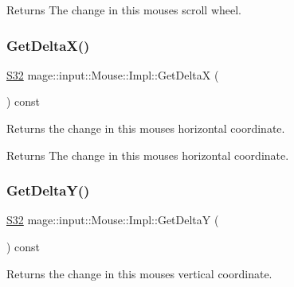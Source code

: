 \begin{DoxyReturn}{Returns}
The change in this mouse\textquotesingle{}s scroll wheel. 
\end{DoxyReturn}
\hypertarget{classmage_1_1input_1_1_mouse_1_1_impl_a61e7ce497a1779fcd58bce1bf067abfe}{}\label{classmage_1_1input_1_1_mouse_1_1_impl_a61e7ce497a1779fcd58bce1bf067abfe} 
\subsubsection{\texorpdfstring{Get\+Delta\+X()}{GetDeltaX()}}
{\footnotesize\ttfamily \hyperlink{namespacemage_a642e05c5c83642b6946703615cdbf2da}{S32} mage\+::input\+::\+Mouse\+::\+Impl\+::\+Get\+DeltaX (\begin{DoxyParamCaption}{ }\end{DoxyParamCaption}) const\hspace{0.3cm}{\ttfamily [noexcept]}}

Returns the change in this mouse\textquotesingle{}s horizontal coordinate.

\begin{DoxyReturn}{Returns}
The change in this mouse\textquotesingle{}s horizontal coordinate. 
\end{DoxyReturn}
\hypertarget{classmage_1_1input_1_1_mouse_1_1_impl_accce0b038c380bf32625de965a83e1db}{}\label{classmage_1_1input_1_1_mouse_1_1_impl_accce0b038c380bf32625de965a83e1db} 
\subsubsection{\texorpdfstring{Get\+Delta\+Y()}{GetDeltaY()}}
{\footnotesize\ttfamily \hyperlink{namespacemage_a642e05c5c83642b6946703615cdbf2da}{S32} mage\+::input\+::\+Mouse\+::\+Impl\+::\+Get\+DeltaY (\begin{DoxyParamCaption}{ }\end{DoxyParamCaption}) const\hspace{0.3cm}{\ttfamily [noexcept]}}

Returns the change in this mouse\textquotesingle{}s vertical coordinate.

